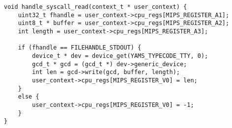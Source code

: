 \documentclass[11pt]{article}
\begin{document}
\begin{lstlisting}
void handle_syscall_read(context_t * user_context) {
    uint32_t fhandle = user_context->cpu_regs[MIPS_REGISTER_A1];
    uint8_t * buffer = user_context->cpu_regs[MIPS_REGISTER_A2];
    int length = user_context->cpu_regs[MIPS_REGISTER_A3];

    if (fhandle == FILEHANDLE_STDOUT) {
        device_t * dev = device_get(YAMS_TYPECODE_TTY, 0);
        gcd_t * gcd = (gcd_t *) dev->generic_device;
        int len = gcd->write(gcd, buffer, length);
        user_context->cpu_regs[MIPS_REGISTER_V0] = len;
    }
    else {
        user_context->cpu_regs[MIPS_REGISTER_V0] = -1;
    }
}
\end{lstlisting}
\end{document}
